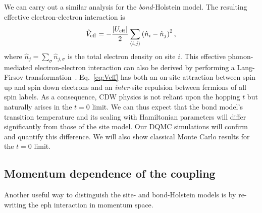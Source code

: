\documentclass[%
reprint,
superscriptaddress,
nofootinbib,
twocolumn,
amsmath,amssymb,
aps,
prb,
]{revtex4-2}
\begin{document}
We can carry out a similar analysis for the {\it bond}-Holstein model. The resulting effective electron-electron interaction is
\begin{equation}\label{eq:Veff}
\hat{V}_\mathrm{eff} = -\frac{|U_{\rm eff}|}{2} \sum_{\langle i,j\rangle}\left(\hat{n}_{i} - \hat{n}_{j} \right)^2,
\end{equation}
where
$\hat{n}_{j} = \sum_\sigma \hat{n}_{j,\sigma}$
is the total electron density on site $i$. This effective phonon-mediated electron-electron interaction can also be derived by performing a Lang-Firsov transformation~\cite{Slezak2006, Lau2007single}. Eq.~\eqref{eq:Veff} has both an on-site attraction between spin up and spin down electrons and an {\it inter}-site repulsion between fermions of all spin labels. As a consequence, \gls*{CDW} physics is not reliant upon the hopping $t$ but naturally arises in the $t=0$ limit. We can thus expect that the bond model's transition temperature and its scaling with Hamiltonian parameters will differ significantly from those of the site model. Our \gls*{DQMC} simulations will confirm and quantify this difference. We will also show classical Monte Carlo results for the $t=0$ limit.

\subsection{Momentum dependence of the coupling}\label{sec:model_gq}
Another useful way to distinguish the site- and bond-Holstein models is by re-writing the \gls*{eph} interaction in momentum space.
\end{document}
